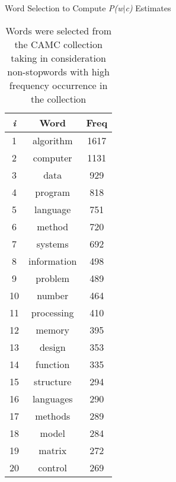 \begin{table}[!ht]
	\caption{Word Selection to Compute \textit{P(w$|$c)} Estimates} \label{tab:word-sel}
	\begin{center}
	\vspace{-5mm}
		\begin{tabular}{c  c  c }
			\toprule		
			\textit{i} & Word & Freq\\
			\midrule			
			1 & algorithm & 1617\\
			2 & computer & 1131\\
			3 & data & 929\\
			4 & program & 818\\
			5 & language & 751\\
			6 & method & 720\\
			7 & systems & 692\\
			8 & information & 498\\
			9 & problem & 489\\
			10 & number & 464\\
			11 & processing & 410\\
			12 & memory & 395\\
			13 & design & 353\\
			14 & function & 335\\
			15 & structure & 294\\
			16 & languages & 290\\
			17 & methods & 289\\
			18 & model & 284\\
			19 & matrix & 272\\
			20 & control & 269\\
			\bottomrule			
		\end{tabular}
	\caption*{\scriptsize Words were selected from the CAMC collection taking in consideration non-stopwords with high frequency occurrence in the collection}
	 \end{center}
\end{table}
